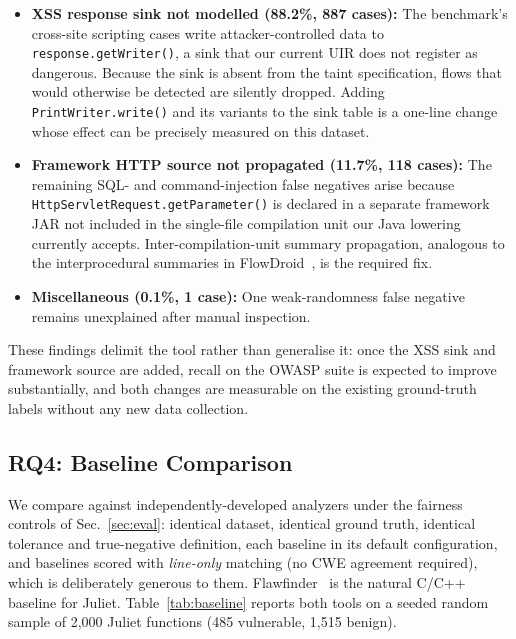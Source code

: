 \documentclass[10pt,conference]{IEEEtran}
\begin{document}
\begin{itemize}
  \item \textbf{XSS response sink not modelled (88.2\%, 887 cases):} The
  benchmark's cross-site scripting cases write attacker-controlled data to
  \texttt{response.getWriter()}, a sink that our current UIR does not
  register as dangerous. Because the sink is absent from the taint
  specification, flows that would otherwise be detected are silently dropped.
  Adding \texttt{PrintWriter.write()} and its variants to the sink table is a
  one-line change whose effect can be precisely measured on this dataset.

  \item \textbf{Framework HTTP source not propagated (11.7\%, 118 cases):} The
  remaining SQL- and command-injection false negatives arise because
  \texttt{HttpServletRequest.getParameter()} is declared in a separate
  framework JAR not included in the single-file compilation unit our Java
  lowering currently accepts. Inter-compilation-unit summary propagation,
  analogous to the interprocedural summaries in FlowDroid~\cite{arzt2014},
  is the required fix.

  \item \textbf{Miscellaneous (0.1\%, 1 case):} One weak-randomness false
  negative remains unexplained after manual inspection.
\end{itemize}

These findings delimit the tool rather than generalise it: once the XSS sink
and framework source are added, recall on the OWASP suite is expected to
improve substantially, and both changes are measurable on the existing
ground-truth labels without any new data collection.

\subsection{RQ4: Baseline Comparison}
We compare against independently-developed analyzers under the fairness
controls of Sec.~\ref{sec:eval}: identical dataset, identical ground truth,
identical tolerance and true-negative definition, each baseline in its
default configuration, and baselines scored with \emph{line-only} matching
(no CWE agreement required), which is deliberately generous to them.
Flawfinder~\cite{flawfinder} is the natural C/C++ baseline for Juliet.
Table~\ref{tab:baseline} reports both tools on a seeded random sample of
2{,}000 Juliet functions (485 vulnerable, 1{,}515 benign).
\end{document}
